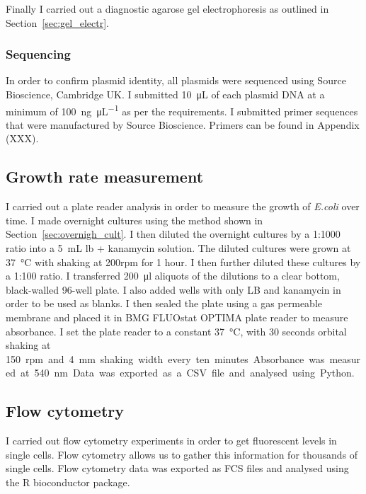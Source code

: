 Finally I carried out a diagnostic agarose gel electrophoresis as outlined in Section~\ref{sec:gel_electr}.

\subsubsection{Sequencing}
In order to confirm plasmid identity, all plasmids were sequenced using Source Bioscience, Cambridge UK. I submitted \SI{10}{\micro\liter} of each plasmid DNA at a minimum of \SI{100}{\nano\gram\per\micro\liter} as per the requirements. I submitted primer sequences that were manufactured by Source Bioscience. Primers can be found in Appendix (XXX). 

\subsection{Growth rate measurement}
\label{sec:growth_meth}
I carried out a plate reader analysis in order to measure the growth of \textit{E.coli} over time. I made overnight cultures using the method shown in Section~\ref{sec:overnigh_cult}. I then diluted the overnight cultures by a 1:1000 ratio into a \SI{5}{\milli\liter} \acrshort{lb} + kanamycin solution. The diluted cultures were grown at \SI{37}{\celsius} with shaking at 200rpm for 1 hour. I then further diluted these cultures by a 1:100 ratio. I transferred \SI{200}{\ul} aliquots of the dilutions to a clear bottom, black-walled 96-well plate. I also added wells with only LB and kanamycin in order to be used as blanks. I then sealed the plate using a gas permeable membrane and placed it in BMG FLUOstat OPTIMA plate reader to measure absorbance. I set the plate reader to a constant \SI{37}{\celsius}, with 30 seconds orbital shaking at \SI{150}rpm and \SI{4}{\milli\metre} shaking width every ten minutes. Absorbance was measured at \SI{540}{\nano\meter}. Data was exported as a CSV file and analysed using Python. 

\subsection{Flow cytometry}
I carried out flow cytometry experiments in order to get fluorescent levels in single cells. Flow cytometry allows us to gather this information for thousands of single cells. Flow cytometry data was exported as FCS files and analysed using the R bioconductor package. 

